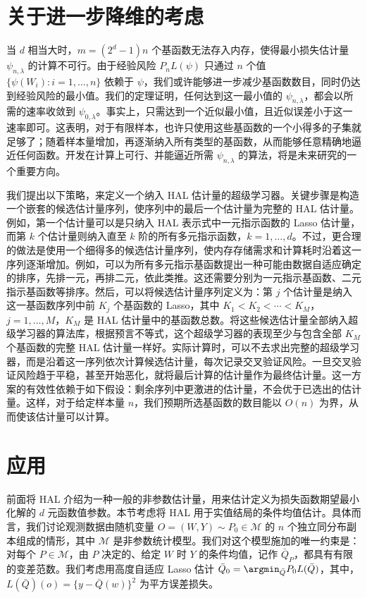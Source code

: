 \section{关于进一步降维的考虑}
\label{sec:ch06-dimension-reduction}

当 $d$ 相当大时，$m=(2^d-1)n$ 个基函数无法存入内存，使得最小损失估计量 $\psi_{n,\lambda}$ 的计算不可行。由于经验风险 $P_nL(\psi)$ 只通过 $n$ 个值 $\{\psi(W_i):i=1,\ldots,n\}$ 依赖于 $\psi$，我们或许能够进一步减少基函数数目，同时仍达到经验风险的最小值。我们的定理证明，任何达到这一最小值的 $\psi_{n,\lambda}$，都会以所需的速率收敛到 $\psi_{0,\lambda}$。事实上，只需达到一个近似最小值，且近似误差小于这一速率即可。这表明，对于有限样本，也许只使用这些基函数的一个小得多的子集就足够了；随着样本量增加，再逐渐纳入所有类型的基函数，从而能够任意精确地逼近任何函数。开发在计算上可行、并能逼近所需 $\psi_{n,\lambda}$ 的算法，将是未来研究的一个重要方向。

我们提出以下策略，来定义一个纳入 HAL 估计量的超级学习器。关键步骤是构造一个嵌套的候选估计量序列，使序列中的最后一个估计量为完整的 HAL 估计量。例如，第一个估计量可以是只纳入 HAL 表示式中一元指示函数的 Lasso 估计量，而第 $k$ 个估计量则纳入直至 $k$ 阶的所有多元指示函数，$k=1,\ldots,d$。不过，更合理的做法是使用一个细得多的候选估计量序列，使内存存储需求和计算耗时沿着这一序列逐渐增加。例如，可以为所有多元指示基函数提出一种可能由数据自适应确定的排序，先排一元，再排二元，依此类推。这还需要分别为一元指示基函数、二元指示基函数等排序。然后，可以将候选估计量序列定义为：第 $j$ 个估计量是纳入这一基函数序列中前 $K_j$ 个基函数的 Lasso，其中 $K_1<K_2<\cdots<K_M$，$j=1,\ldots,M$，$K_M$ 是 HAL 估计量中的基函数总数。将这些候选估计量全部纳入超级学习器的算法库，根据预言不等式，这个超级学习器的表现至少与包含全部 $K_M$ 个基函数的完整 HAL 估计量一样好。实际计算时，可以不去求出完整的超级学习器，而是沿着这一序列依次计算候选估计量，每次记录交叉验证风险。一旦交叉验证风险趋于平稳，甚至开始恶化，就将最后计算的估计量作为最终估计量。这一方案的有效性依赖于如下假设：剩余序列中更激进的估计量，不会优于已选出的估计量。这样，对于给定样本量 $n$，我们预期所选基函数的数目能以 $O(n)$ 为界，从而使该估计量可以计算。

\section{应用}
\label{sec:ch06-applications}

前面将 HAL 介绍为一种一般的非参数估计量，用来估计定义为损失函数期望最小化解的 $d$ 元函数值参数。本节考虑将 HAL 用于实值结局的条件均值估计。具体而言，我们讨论观测数据由随机变量 $O=(W,Y)\sim P_0\in\mathcal M$ 的 $n$ 个独立同分布副本组成的情形，其中 $\mathcal M$ 是非参数统计模型。我们对这个模型施加的唯一约束是：对每个 $P\in\mathcal M$，由 $P$ 决定的、给定 $W$ 时 $Y$ 的条件均值，记作 $\bar Q_P$，都具有有限的变差范数。我们考虑用高度自适应 Lasso 估计 $\bar Q_0=\argmin_{\bar Q}P_0L(\bar Q)$，其中，$L(\bar Q)(o)=\{y-\bar Q(w)\}^2$ 为平方误差损失。

